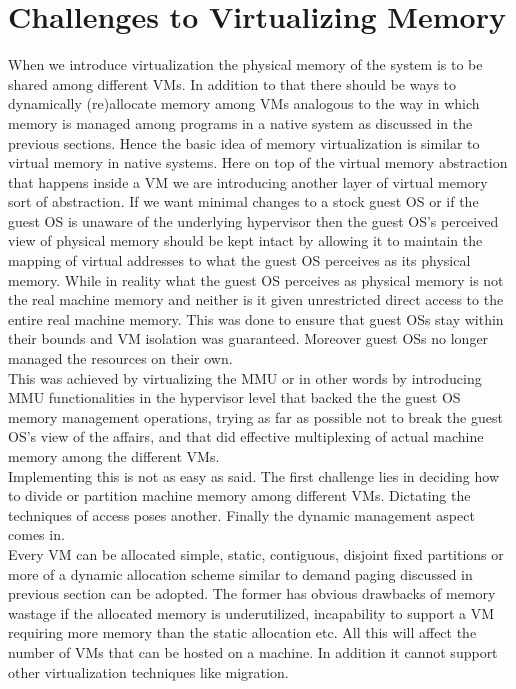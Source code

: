 \section{Challenges to Virtualizing Memory} \label{challenges}
When we introduce virtualization the physical memory of the system is to be shared among different
VMs. In addition to that there should be ways to dynamically (re)allocate memory among VMs
analogous to the way in which memory is managed among programs in a native system as discussed in
the previous sections. Hence the basic idea of memory virtualization is similar to virtual memory
in native systems. Here on top of the virtual memory abstraction that happens inside a VM we are
introducing another layer of virtual memory sort of abstraction. If we want minimal changes to a
stock guest OS or if the guest OS is unaware of the underlying hypervisor then the guest OS's
perceived view of physical memory should be kept intact by allowing it to maintain the mapping of
virtual addresses to what the guest OS perceives as its physical memory. While in reality what the
guest OS perceives as physical memory is not the real machine memory and neither is it given
unrestricted direct access to the entire real machine memory. This was done to ensure that guest
OSs stay within their bounds and VM isolation was guaranteed. Moreover guest OSs no longer managed
the resources on their own.\\
This was achieved by virtualizing the MMU or in other words by introducing MMU functionalities in
the hypervisor level that backed the the guest OS memory management operations, trying as far as
possible not to break the guest OS's view of the affairs, and that did effective multiplexing of
actual machine memory among the different VMs.\\
Implementing this is not as easy as said. The first challenge lies in deciding how to divide or
partition machine memory among different VMs. Dictating the techniques of access poses another.
Finally the dynamic management aspect comes in.\\
Every VM can be allocated simple, static, contiguous, disjoint fixed partitions or more of a
dynamic allocation scheme similar to demand paging discussed in previous section can be adopted.
The former has obvious drawbacks of memory wastage if the allocated memory is underutilized,
incapability to support a VM requiring more memory than the static allocation etc. All this will
affect the number of VMs that can be hosted on a machine. In addition it cannot support other
virtualization techniques like migration. 
